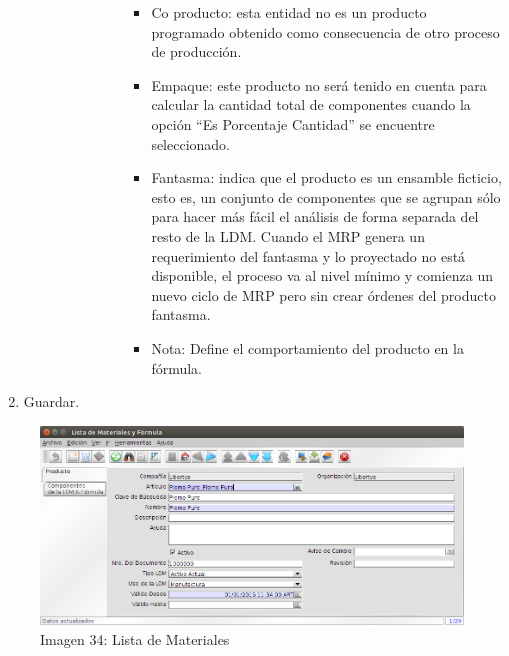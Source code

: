 \documentclass[letterpaper,10pt,spanish]{sphinxmanual}
\begin{document}
\begin{enumerate}
\begin{description}
\begin{itemize}
\begin{description}
\begin{itemize}
\item {} 
Co producto: esta entidad no es un producto programado obtenido como consecuencia de otro proceso de producción.

\item {} 
Empaque: este producto no será tenido en cuenta para calcular la cantidad total de componentes cuando la opción “Es Porcentaje Cantidad” se encuentre seleccionado.

\item {} 
Fantasma: indica que el producto es un ensamble ficticio, esto es, un conjunto de componentes que se agrupan sólo para hacer más fácil el análisis de forma separada del resto de la LDM. Cuando el MRP genera un requerimiento del fantasma y lo proyectado no está disponible, el proceso va al nivel mínimo y comienza un nuevo ciclo de MRP pero sin crear órdenes del producto fantasma.

\item {} 
Nota: Define el comportamiento del producto en la fórmula.

\end{itemize}

\end{description}

\end{itemize}

\end{description}

\item {} 
Guardar.

\end{enumerate}
\begin{figure}[htbp]
\centering
\capstart

\includegraphics{ly_ldm_1.png}
\caption{Imagen 34: Lista de Materiales}\end{figure}
\end{document}
